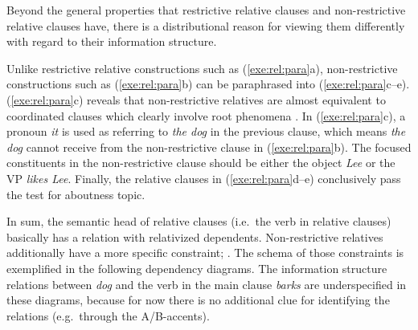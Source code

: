 Beyond the general properties that restrictive relative clauses and
non-restrictive relative clauses have, there is a distributional
reason for viewing them differently with regard to their information
structure.


\noindent Unlike restrictive relative constructions such as
(\ref{exe:rel:para}a), non-restrictive
constructions such as (\ref{exe:rel:para}b) can be paraphrased into
(\ref{exe:rel:para}c--e). (\ref{exe:rel:para}c) reveals that
non-restrictive relatives are almost equivalent to coordinated clauses
which clearly involve root phenomena
\citep[177]{heycock:07}. In
(\ref{exe:rel:para}c), a pronoun \textit{it} is used as referring to
\textit{the dog} in the previous clause, which means \textit{the dog}
cannot receive  from the non-restrictive clause in
(\ref{exe:rel:para}b). The focused constituents in the non-restrictive
clause should be either the object \textit{Lee} or the VP
\textit{likes Lee}.  Finally, the relative clauses in
(\ref{exe:rel:para}d--e) conclusively pass the test for aboutness
topic.














In sum, the semantic head of relative clauses (i.e.\ the verb in
relative clauses) basically has a  relation with
relativized dependents. Non-restrictive relatives
additionally have a more specific constraint;
. The schema of those constraints is exemplified
in the following dependency diagrams. The information structure
relations between \textit{dog} and the verb in the main clause
\textit{barks} are underspecified in these diagrams, because for now
there is no additional clue for identifying the relations
(e.g.\ through the A/B-accents).



